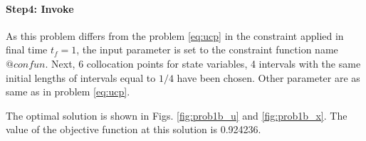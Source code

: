 \paragraph{Step4: Invoke~}

{\small }

As this problem differs from the problem \eqref{eq:ucp} in the
constraint applied in final time $t_{f} = 1$, the input parameter
 is set to the constraint function name
$@confun$. Next, 6 collocation points for state variables, 4 intervals
with the same initial lengths of intervals equal to $1/4$ have been
chosen. Other parameter are as same as in problem \eqref{eq:ucp}.

The optimal solution is shown in Figs. \ref{fig:prob1b_u} and
\ref{fig:prob1b_x}. The value of the objective function at this
solution is 0.924236. 

